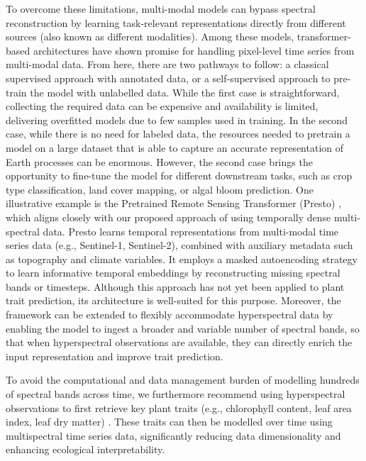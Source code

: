 \documentclass[pdflatex,sn-mathphys-num]{sn-jnl}%
\theoremstyle{thmstyleone}%
\theoremstyle{thmstyletwo}%
\theoremstyle{thmstylethree}%
\begin{document}
To overcome these limitations, multi-modal models can bypass spectral reconstruction by learning task-relevant representations directly from different sources (also known as different modalities). Among these models, transformer-based architectures have shown promise for handling pixel-level time series from multi-modal data. From here, there are two pathways to follow: a classical supervised approach with annotated data, or a self-supervised approach to pre-train the model with unlabelled data. While the first case is straightforward, collecting the required data can be expensive and availability is limited, delivering overfitted models due to few samples used in training. In the second case, while there is no need for labeled data, the resources needed to pretrain a model on a large dataset that is able to capture an accurate representation of Earth processes can be enormous. However, the second case brings the opportunity to fine-tune the model for different downstream tasks, such as crop type classification, land cover mapping, or algal bloom prediction. One illustrative example is the Pretrained Remote Sensing Transformer (Presto) \cite{tseng2023lightweight}, which aligns closely with our proposed approach of using temporally dense multi-spectral data. Presto learns temporal representations from multi-modal time series data (e.g., Sentinel-1, Sentinel-2), combined with auxiliary metadata such as topography and climate variables. It employs a masked autoencoding strategy to learn informative temporal embeddings by reconstructing missing spectral bands or timesteps. Although this approach has not yet been applied to plant trait prediction, its architecture is well-suited for this purpose. Moreover, the framework can be extended to flexibly accommodate hyperspectral data by enabling the model to ingest a broader and variable number of spectral bands, so that when hyperspectral observations are available, they can directly enrich the input representation and improve trait prediction.


To avoid the computational and data management burden of modelling hundreds of spectral bands across time, we furthermore recommend using hyperspectral observations to first retrieve key plant traits (e.g., chlorophyll content, leaf area index, leaf dry matter) \cite{cherif2023spectra}. These traits can then be modelled over time using multispectral time series data, significantly reducing data dimensionality and enhancing ecological interpretability.
\end{document}
